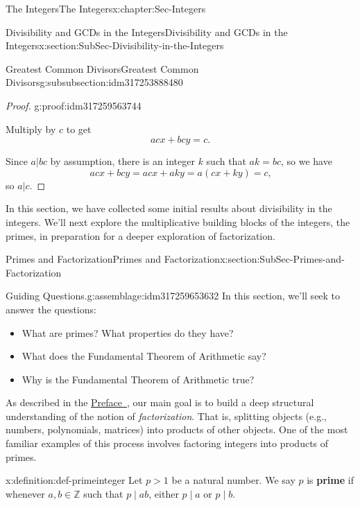 \documentclass[oneside,10pt,]{book}
\newcommand{\terminology}[1]{\textbf{#1}}
\numberwithin{equation}{section}
\def\Z{{\mathbb Z}}
\begin{document}
\begin{chapterptx}{The Integers}{}{The Integers}{}{}{x:chapter:Sec-Integers}
\begin{sectionptx}{Divisibility and GCDs in the Integers}{}{Divisibility and GCDs in the Integers}{}{}{x:section:SubSec-Divisibility-in-the-Integers}
\begin{subsubsectionptx}{Greatest Common Divisors}{}{Greatest Common Divisors}{}{}{g:subsubsection:idm317253888480}
\begin{proof}{}{g:proof:idm317259563744}
%
\par
Multiply by \(c\) to get%
\begin{equation*}
acx + bcy = c\text{.}
\end{equation*}
%
\par
Since \(a|bc\) by assumption, there is an integer \(k\) such that \(ak = bc\), so we have%
\begin{equation*}
acx + bcy = acx + aky = a(cx+ky) = c\text{,}
\end{equation*}
so \(a|c\).%
\end{proof}
\end{subsubsectionptx}
\begin{conclusion}{}%
In this section, we have collected some initial results about divisibility in the integers. We'll next explore the multiplicative building blocks of the integers, the primes, in preparation for a deeper exploration of factorization.%
\end{conclusion}%
\end{sectionptx}
%
%
\typeout{************************************************}
\typeout{************************************************}
%
\begin{sectionptx}{Primes and Factorization}{}{Primes and Factorization}{}{}{x:section:SubSec-Primes-and-Factorization}
\begin{assemblage}{Guiding Questions.}{g:assemblage:idm317259653632}%
In this section, we'll seek to answer the questions: %
\begin{itemize}[label=\textbullet]
\item{}What are primes? What properties do they have?%
\item{}What does the Fundamental Theorem of Arithmetic say?%
\item{}Why is the Fundamental Theorem of Arithmetic true?%
\end{itemize}
%
\end{assemblage}
As described in the \hyperref[x:preface:Sec-Introduction]{Preface~}, our main goal is to build a deep structural understanding of the notion of \emph{factorization}. That is, splitting objects (e.g., numbers, polynomials, matrices) into products of other objects. One of the most familiar examples of this process involves factoring integers into products of primes.%
\begin{definition}{}{x:definition:def-primeinteger}%
%
%
Let \(p > 1\) be a natural number. We say \(p\) is \terminology{prime} if whenever \(a,b\in \Z\) such that \(p\mid ab\), either \(p\mid a\) or \(p\mid b\).%

\end{definition}
\end{sectionptx}
\end{chapterptx}
\end{document}
